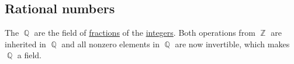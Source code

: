 \subsection{Rational numbers}\label{subsec:rational_numbers}

\begin{definition}\label{def:rational_numbers}
  The  \( \BbbQ \) are the field of \hyperref[def:field_of_fractions]{fractions} of the \hyperref[def:set_of_integers]{integers}. Both operations from \( \BbbZ \) are inherited in \( \BbbQ \) and all nonzero elements in \( \BbbQ \) are now invertible, which makes \( \BbbQ \) a field.
\end{definition}
